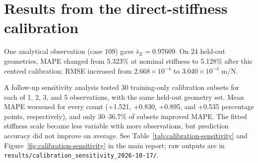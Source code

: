 \section{Results from the direct-stiffness calibration}
One analytical observation (case 109) gave $\widehat{s}_E=0.97609$. On 24 held-out geometries, MAPE changed from 5.323\% at nominal stiffness to 5.128\% after this centred calibration; RMSE increased from $2.668\times10^{-4}$ to $3.040\times10^{-4}$ m/N.

A follow-up sensitivity analysis tested 30 training-only calibration subsets for each of 1, 2, 3, and 5 observations, with the same held-out geometry set. Mean MAPE worsened for every count (+1.521, +0.830, +0.895, and +0.535 percentage points, respectively), and only 30--36.7\% of subsets improved MAPE. The fitted stiffness scale became less variable with more observations, but prediction accuracy did not improve on average. See Table~\ref{tab:calibration-sensitivity} and Figure~\ref{fig:calibration-sensitivity} in the main report; raw outputs are in \texttt{results/calibration\_sensitivity\_2026-10-17/}.
